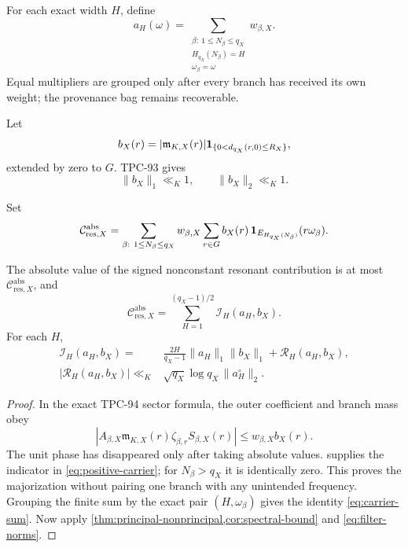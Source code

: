 For each exact width \(H\), define
\begin{equation}
 a_H(\omega)
 =
 \sum_{\substack{\beta:\ 1\le N_\beta\le q_X\\
  H_{q_X}(N_\beta)=H\\
  \omega_\beta=\omega}}
 w_{\beta,X}.
\label{eq:native-census}
\end{equation}
Equal multipliers are grouped only after every branch has received
its own weight; the provenance bag remains recoverable.

Let
\[
 b_X(r)=|\mathfrak m_{K,X}(r)|
 \mathbf 1_{\{0<d_{q_X}(r,0)\le R_X\}},
\]
extended by zero to \(G\).  TPC-93 gives
\begin{equation}
 \|b_X\|_1\ll_K1,\qquad
 \|b_X\|_2\ll_K1.
\label{eq:filter-norms}
\end{equation}

\begin{definition}
\label{def:positive-carrier}
Set
\begin{equation}
 \mathcal C_{\mathrm{res},X}^{\mathrm{abs}}
 =
 \sum_{\substack{\beta:\ 1\le N_\beta\le q_X}}
 w_{\beta,X}
 \sum_{r\in G}
 b_X(r)\,
 \mathbf 1_{E_{H_{q_X}(N_\beta)}}(r\omega_\beta).
\label{eq:positive-carrier}
\end{equation}
\end{definition}

\begin{theorem}
\label{thm:literal-carrier}
The absolute value of the signed nonconstant resonant contribution
is at most \(\mathcal C_{\mathrm{res},X}^{\mathrm{abs}}\), and
\begin{equation}
 \boxed{
 \mathcal C_{\mathrm{res},X}^{\mathrm{abs}}
 =
 \sum_{H=1}^{(q_X-1)/2}
 \mathcal I_H(a_H,b_X).}
\label{eq:carrier-sum}
\end{equation}
For each \(H\),
\begin{align}
 \mathcal I_H(a_H,b_X)
 ={}&
 \frac{2H}{q_X-1}
 \|a_H\|_1\|b_X\|_1
 +\mathcal R_H(a_H,b_X),
\label{eq:literal-principal-remainder}\\
 |\mathcal R_H(a_H,b_X)|
 \ll_K{}&
 \sqrt{q_X}\log q_X\,\|a_H^\circ\|_2.
\label{eq:literal-remainder-bound}
\end{align}
\end{theorem}

\begin{proof}
In the exact TPC-94 sector formula, the outer coefficient and branch
mass obey
\[
 |A_{\beta,X}\mathfrak m_{K,X}(r)
   \zeta_{\beta,r}S_{\beta,X}(r)|
 \le w_{\beta,X}b_X(r).
\]
The unit phase has disappeared only after taking absolute values.
 supplies the indicator in
\eqref{eq:positive-carrier}; for \(N_\beta>q_X\) it is identically
zero.  This proves the majorization without pairing one branch with
any unintended frequency.  Grouping the finite sum by the exact
pair \((H,\omega_\beta)\) gives the identity
\eqref{eq:carrier-sum}.  Now apply
\cref{thm:principal-nonprincipal,cor:spectral-bound} and
\eqref{eq:filter-norms}.
\end{proof}

